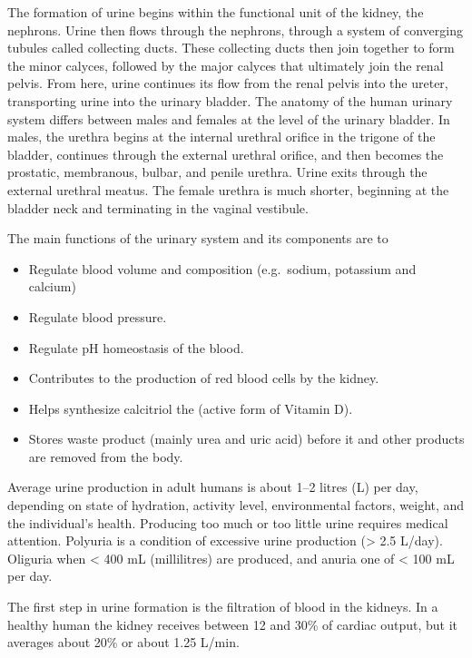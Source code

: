 The formation of urine begins within the functional unit of the kidney, the nephrons. Urine then flows through the nephrons, through a system of converging tubules called collecting ducts. These collecting ducts then join together to form the minor calyces, followed by the major calyces that ultimately join the renal pelvis. From here, urine continues its flow from the renal pelvis into the ureter, transporting urine into the urinary bladder. The anatomy of the human urinary system differs between males and females at the level of the urinary bladder. In males, the urethra begins at the internal urethral orifice in the trigone of the bladder, continues through the external urethral orifice, and then becomes the prostatic, membranous, bulbar, and penile urethra. Urine exits through the external urethral meatus. The female urethra is much shorter, beginning at the bladder neck and terminating in the vaginal vestibule.

The main functions of the urinary system and its components are to

\begin{itemize}
\tightlist
\item
  Regulate blood volume and composition (e.g.~sodium, potassium and calcium)
\item
  Regulate blood pressure.
\item
  Regulate pH homeostasis of the blood.
\item
  Contributes to the production of red blood cells by the kidney.
\item
  Helps synthesize calcitriol the (active form of Vitamin D).
\item
  Stores waste product (mainly urea and uric acid) before it and other products are removed from the body.
\end{itemize}

Average urine production in adult humans is about 1--2 litres (L) per day, depending on state of hydration, activity level, environmental factors, weight, and the individual's health. Producing too much or too little urine requires medical attention. Polyuria is a condition of excessive urine production (\textgreater{} 2.5 L/day). Oliguria when \textless{} 400 mL (millilitres) are produced, and anuria one of \textless{} 100 mL per day.

The first step in urine formation is the filtration of blood in the kidneys. In a healthy human the kidney receives between 12 and 30\% of cardiac output, but it averages about 20\% or about 1.25 L/min.

